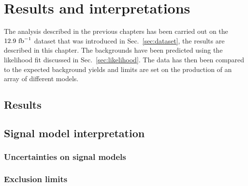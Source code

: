 \chapter{Results and interpretations}
\label{chap:results}

The analysis described in the previous chapters has been carried out
on the $12.9~\text{fb}^{-1}$ dataset that was introduced in
Sec.~\ref{sec:dataset}, the results are described in this chapter. The
\SM backgrounds have been predicted using the likelihood fit discussed
in Sec.~\ref{sec:likelihood}. The data has then been compared to the expected
background yields and limits are set on the production of an array of
different \SUSY models.

\section{Results}





\section{Signal model interpretation}
\label{sec:signalModel}



\subsection{Uncertainties on signal models}


\subsection{Exclusion limits}


